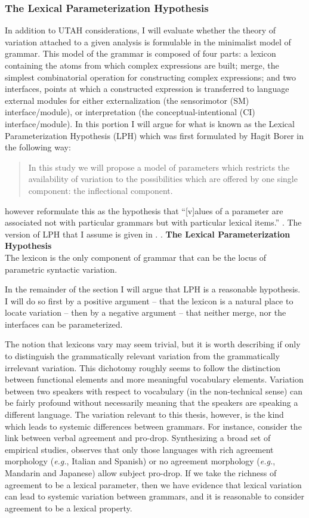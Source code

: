 \documentclass[MilwayThesis]{subfiles}
\begin{document}
\subsubsection{The Lexical Parameterization Hypothesis}
In addition to UTAH considerations, I will evaluate whether the theory of variation attached to a given analysis is formulable in the minimalist model of grammar.
This model of the grammar is composed of four parts:
	a lexicon containing the atoms from which complex expressions are built;
	merge, the simplest combinatorial operation for constructing complex expressions; 
	and two interfaces, points at which a constructed expression is transferred to language external modules for either externalization (the sensorimotor (SM) interface/module), or interpretation (the conceptual-intentional (CI) interface/module).
In this portion I will argue for what is known as the Lexical Parameterization Hypothesis (LPH) which was first formulated by Hagit Borer in the following way:
\begin{quote}
	In this study we will propose a model of parameters which restricts the availability of variation to the possibilities which are offered by one single component: the inflectional component. \parencite[3]{borer1984parametric}
\end{quote}
\textcite{manzini1987parameters} however reformulate this as the hypothesis that ``[v]alues of a parameter are associated not with particular grammars but with particular lexical items.'' \parencite[424]{manzini1987parameters}.
The version of LPH that I assume is given in \Next.
\ex. \textbf{The Lexical Parameterization Hypothesis}\\
The lexicon is the only component of grammar that can be the locus of parametric syntactic variation.

In the remainder of the section I will argue that LPH is a reasonable hypothesis.
I will do so first by a positive argument -- that the lexicon is a natural place to locate variation -- then by a negative argument -- that neither merge, nor the interfaces can be parameterized.

The notion that lexicons vary may seem trivial, but it is worth describing if only to distinguish the grammatically relevant variation from the grammatically irrelevant variation.
This dichotomy roughly seems to follow the distinction between functional elements and more meaningful vocabulary elements.
Variation between two speakers with respect to vocabulary (in the non-technical sense) can be fairly profound without necessarily meaning that the speakers are speaking a different language.
The variation relevant to this thesis, however, is the kind which leads to systemic differences between grammars.
For instance, consider the link between verbal agreement and pro-drop.
Synthesizing a broad set of empirical studies, \textcite{huang1984distribution} observes that only those languages with rich agreement morphology (\textit{e.g.}, Italian and Spanish) or no agreement morphology (\textit{e.g.}, Mandarin and Japanese) allow subject pro-drop.
If we take the richness of agreement to be a lexical parameter, then we have evidence that lexical variation can lead to systemic variation between grammars, and it is reasonable to consider agreement to be a lexical property.
\end{document}
